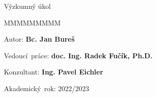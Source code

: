 {%
\vspace{2cm}

{\large{}Výzkumný úkol}{\large\par}
\vfill{}

\begin{lyxlist}{MMMMMMMMM}
	\begin{singlespace}
		\item [{Autor:}] \textbf{Bc. Jan Bureš}
		\item [{Vedoucí~práce:}] \textbf{doc. Ing. Radek Fučík, Ph.D.}
		\item [{Konzultant:}] \textbf{Ing. Pavel Eichler}
		\item [{Akademický~rok:}] 2022/2023
	\end{singlespace}
\end{lyxlist}
\newpage{}
}



~\newpage{}

~

\vfill{}
